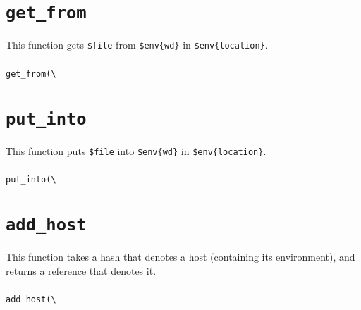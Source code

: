 \documentclass[a4paper,10pt]{report}
\def\|{\verb|} %|
\begin{document}
\section{\texttt{get\_from}}

This function gets \texttt{\$file} from \texttt{\$env\{wd\}} in
\texttt{\$env\{location\}}.

\subsubsection{\format}

\begin{boxnote}
\begin{alltt}
get_from(\|\|%\textit{env}, $file);
\end{alltt}
\end{boxnote}
\vspace{\baselineskip}

\section{\texttt{put\_into}}

This function puts \texttt{\$file} into \texttt{\$env\{wd\}} in
\texttt{\$env\{location\}}.

\subsubsection{\format}

\begin{boxnote}
\begin{alltt}
put_into(\|\|%\textit{env}, $file);
\end{alltt}
\end{boxnote}
\vspace{\baselineskip}


\section{\texttt{add\_host}}

This function takes a hash that denotes a host (containing its
environment), and returns a reference that denotes it.

\subsubsection{\format}

\begin{boxnote}
\begin{alltt}
add_host(\|\|%\textit{env});
\end{alltt}
\end{boxnote}
\end{document}
